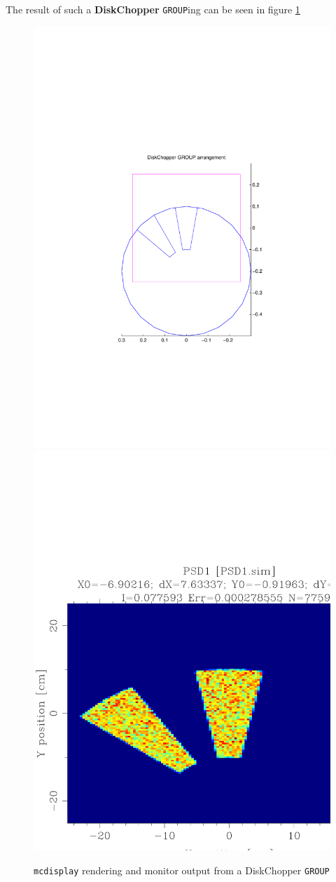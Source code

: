 The result of such a {\bf DiskChopper} \texttt{GROUP}ing can be seen in
figure \ref{f:chopper2}

\begin{figure}[ht]
\includegraphics[width=0.4\linewidth]{figures/DiskChopperGroup}
\includegraphics[width=0.4\linewidth]{figures/DiskChopperPSD}
\caption{\texttt{mcdisplay} rendering and monitor output from a DiskChopper \texttt{GROUP}}
\label{f:chopper2}
\end{figure}
